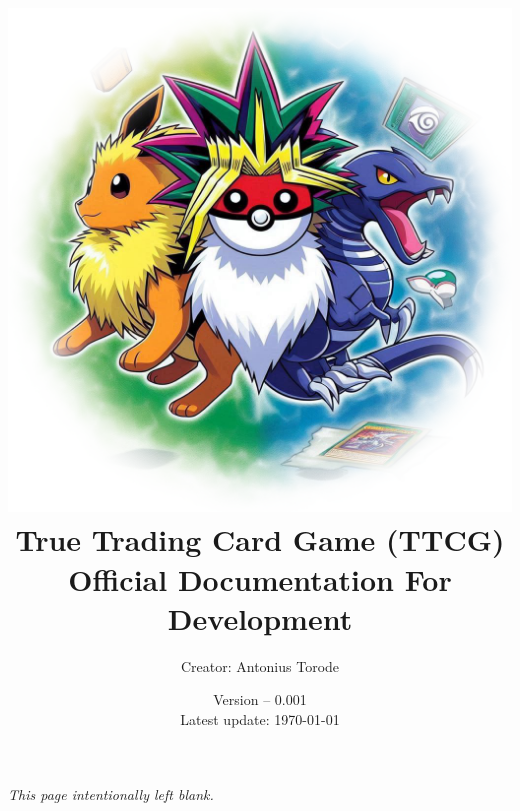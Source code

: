 \documentclass[openany,a4paper,11pt]{book}
\title{\vspace{0.1cm}  \includegraphics[scale=0.5]{./images/man_cover.png} \vspace{.5cm} \\ True Trading Card Game (TTCG) \\ Official Documentation For Development}
\author{Creator: Antonius Torode}
\date{Version -- 0.001 \\ Latest update: \today}
\begin{document}
\frontmatter
\maketitle

\tableofcontents
\newpage
\vspace*{\fill}
\begin{center}
	\textit{This page intentionally left blank.}
\end{center}
\vspace*{\fill}

\mainmatter
\pagestyle{fancy}
\fancyhf{}
\fancyhead[RO, LE]{\thepage}







\backmatter


\printindex
\end{document}
